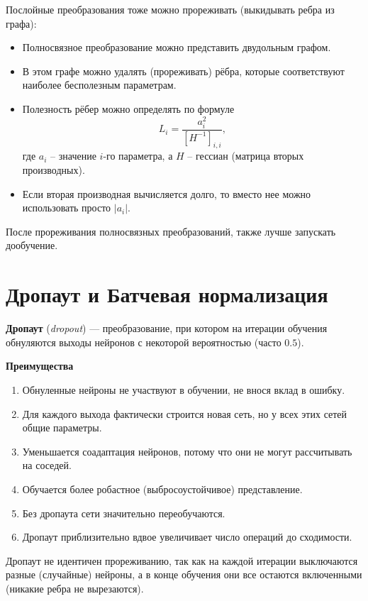 Послойные преобразования тоже можно прореживать (выкидывать ребра из графа):
\begin{itemize}
    \item Полносвязное преобразование можно представить двудольным графом.
    \item В этом графе можно удалять (прореживать) рёбра, которые соответствуют наиболее бесполезным параметрам.
    \item Полезность рёбер можно определять по формуле
    \[
        L_i=\dfrac{a_i^2}{[H^{-1}]_{i,i}},
    \]
    где $a_i$ -- значение $i$-го параметра, а $H$ -- гессиан (матрица вторых производных).
    \item Если вторая производная вычисляется долго, то вместо нее можно использовать просто $|a_i|$.
\end{itemize}

\begin{remark}
    После прореживания полносвязных преобразований, также лучше запускать дообучение.
\end{remark}

\section{Дропаут и Батчевая нормализация}

\begin{definition}
    \textbf{Дропаут} (\textit{dropout}) --- преобразование, при котором на итерации обучения обнуляются выходы нейронов с некоторой вероятностью (часто $0.5$).
\end{definition}

\textbf{Преимущества}
\begin{enumerate}
    \item Обнуленные нейроны не участвуют в обучении, не внося вклад в ошибку.
    \item Для каждого выхода фактически строится новая сеть, но у всех этих сетей общие параметры.
    \item Уменьшается соадаптация нейронов, потому что они не могут рассчитывать на соседей.
    \item Обучается более робастное (выбросоустойчивое) представление.
    \item Без дропаута сети значительно переобучаются.
    \item Дропаут приблизительно вдвое увеличивает число операций до сходимости.
\end{enumerate}

\begin{remark}
    Дропаут не идентичен прореживанию, так как на каждой итерации выключаются разные (случайные) нейроны, а в конце обучения они все остаются включенными (никакие ребра не вырезаются).
\end{remark}

